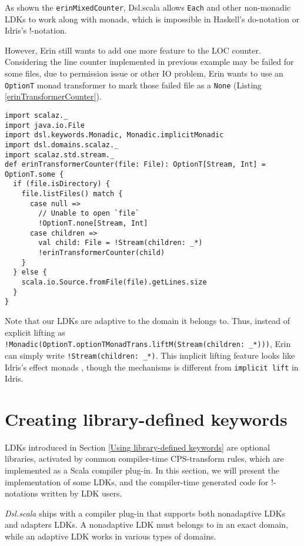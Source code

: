 As shown the \lstinline{erinMixedCounter}, Dsl.scala allows \lstinline{Each} and other non-monadic LDKs to work along with monads, which is impossible in Haskell's do-notation or Idris's !-notation.

However, Erin still wants to add one more feature to the LOC counter. Considering the line counter implemented in previous example may be failed for some files,
due to permission issue or other IO problem,
Erin wants to use an \lstinline{OptionT} monad transformer to mark those failed file as a \lstinline{None} (Listing \ref{erinTransformerCounter}).

\begin{lstlisting}[caption={Erin's line of code counter, using an \lstinline{OptionT} monad transformer},label={erinTransformerCounter}]
import scalaz._
import java.io.File
import dsl.keywords.Monadic, Monadic.implicitMonadic
import dsl.domains.scalaz._
import scalaz.std.stream._
def erinTransformerCounter(file: File): OptionT[Stream, Int] = OptionT.some {
  if (file.isDirectory) {
    file.listFiles() match {
      case null =>
        // Unable to open `file`
        !OptionT.none[Stream, Int]
      case children =>
        val child: File = !Stream(children: _*)
        !erinTransformerCounter(child)
    }
  } else {
    scala.io.Source.fromFile(file).getLines.size
  }
}
\end{lstlisting}

Note that our LDKs are adaptive to the domain it belongs to. Thus, instead of explicit lifting as \lstinline{!Monadic(OptionT.optionTMonadTrans.liftM(Stream(children: _*)))}, Erin can simply write \lstinline{!Stream(children: _*)}. This implicit lifting feature looks like Idris's effect monads \cite{brady2013programming}, though the mechanisms is different from \lstinline{implicit lift} in Idris.

\section{Creating library-defined keywords}\label{Creating library-defined keywords}

LDKs introduced in Section \ref{Using library-defined keywords} are optional libraries, activated by common compiler-time CPS-transform rules, which are implemented as a Scala compiler plug-in. In this section, we will present the implementation of some LDKs, and the compiler-time generated code for !-notations written by LDK users.

\textit{Dsl.scala} ships with a compiler plug-in that supports both nonadaptive LDKs and adapters LDKs. A nonadaptive LDK must belongs to in an exact domain, while an adaptive LDK works in various types of domains.

